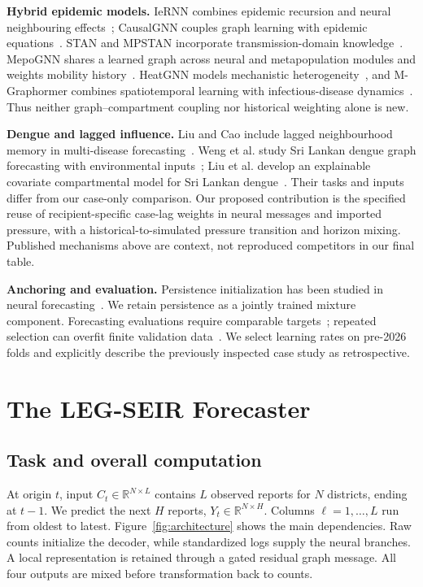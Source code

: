 \documentclass[conference]{IEEEtran}
\begin{document}
\textbf{Hybrid epidemic models.} IeRNN combines epidemic recursion and neural neighbouring effects~\cite{iernn2020}; CausalGNN couples graph learning with epidemic equations~\cite{causalgnn2022}. STAN and MPSTAN incorporate transmission-domain knowledge~\cite{stan2020,mpstan2023}. MepoGNN shares a learned graph across neural and metapopulation modules and weights mobility history~\cite{mepognn2023}. HeatGNN models mechanistic heterogeneity~\cite{heatgnn2024}, and M-Graphormer combines spatiotemporal learning with infectious-disease dynamics~\cite{mgraphormer2025}. Thus neither graph--compartment coupling nor historical weighting alone is new.

\textbf{Dengue and lagged influence.} Liu and Cao include lagged neighbourhood memory in multi-disease forecasting~\cite{liucao2026}. Weng et al. study Sri Lankan dengue graph forecasting with environmental inputs~\cite{weng2024graph}; Liu et al. develop an explainable covariate compartmental model for Sri Lankan dengue~\cite{liu2025seirlstm}. Their tasks and inputs differ from our case-only comparison. Our proposed contribution is the specified reuse of recipient-specific case-lag weights in neural messages and imported pressure, with a historical-to-simulated pressure transition and horizon mixing. Published mechanisms above are context, not reproduced competitors in our final table.

\textbf{Anchoring and evaluation.} Persistence initialization has been studied in neural forecasting~\cite{haugsdal2023persistence}. We retain persistence as a jointly trained mixture component. Forecasting evaluations require comparable targets~\cite{johansson2016evaluation,johansson2019challenge}; repeated selection can overfit finite validation data~\cite{cawley2010selection}. We select learning rates on pre-2026 folds and explicitly describe the previously inspected case study as retrospective.

\section{The LEG-SEIR Forecaster}
\subsection{Task and overall computation}
At origin $t$, input $C_t\in\mathbb R^{N\times L}$ contains $L$ observed reports for $N$ districts, ending at $t-1$. We predict the next $H$ reports, $Y_t\in\mathbb R^{N\times H}$. Columns $\ell=1,\ldots,L$ run from oldest to latest. Figure~\ref{fig:architecture} shows the main dependencies. Raw counts initialize the decoder, while standardized logs supply the neural branches. A local representation is retained through a gated residual graph message. All four outputs are mixed before transformation back to counts.
\end{document}
